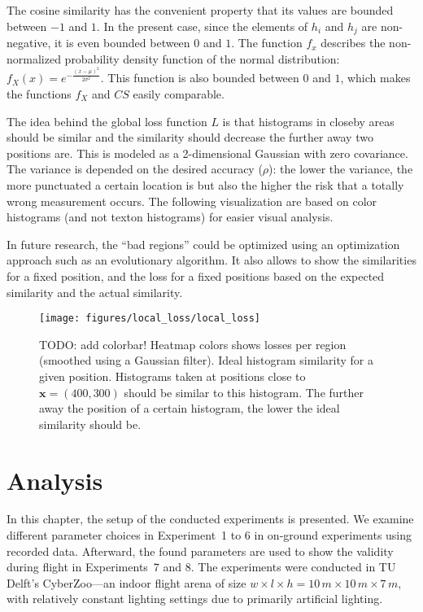 \documentclass{report}
\begin{document}
The cosine similarity has the convenient property that its values are
bounded between $-1$ and $1$. In the present case, since the elements
of $h_i$ and $h_j$ are non-negative, it is even bounded between $0$
and $1$. The function $f_x$ describes the non-normalized probability
density function of the normal distribution:
$f_X(x) = e^{- \frac{(x - \mu)^2}{2 \sigma ^ 2}}$. This function is
also bounded between $0$ and $1$, which makes the functions $f_X$ and
$CS$ easily comparable.

The idea behind the global loss function $L$ is that histograms in
closeby areas should be similar and the similarity should decrease the
further away two positions are. This is modeled as a 2-dimensional
Gaussian with zero covariance. The variance is depended on the desired
accuracy ($\rho$): the lower the variance, the more punctuated a
certain location is but also the higher the risk that a totally wrong
measurement occurs. The following visualization are based on color
histograms (and not texton histograms) for easier visual analysis.

In future research, the ``bad regions'' could be optimized using an
optimization approach such as an evolutionary algorithm. It also
allows to show the similarities for a fixed position, and the loss for
a fixed positions based on the expected similarity and the actual
similarity.

\begin{figure}[h!]
\begin{center}
\texttt{[image: figures/local\_loss/local\_loss]}
\caption{{TODO: add colorbar! Heatmap colors shows losses per region
    (smoothed using a Gaussian filter). Ideal histogram similarity for
    a given position. Histograms taken at positions close to
    $\textbf{x} = (400, 300)$ should be similar to this histogram. The
    further away the position of a certain histogram, the lower the
    ideal similarity should be.%
  }}
\end{center}
\end{figure}

\chapter{Analysis}
\label{chap:analysis}

In this chapter, the setup of the conducted experiments is
presented. We examine different parameter choices in Experiment~1 to 6
in on-ground experiments using recorded data. Afterward, the found
parameters are used to show the validity during flight in
Experiments~7 and 8. The experiments were conducted in TU Delft's
CyberZoo---an indoor flight arena of size
$w \times l \times h = 10\,m \times10\,m \times 7\,m$, with relatively
constant lighting settings due to primarily artificial lighting.
\end{document}

